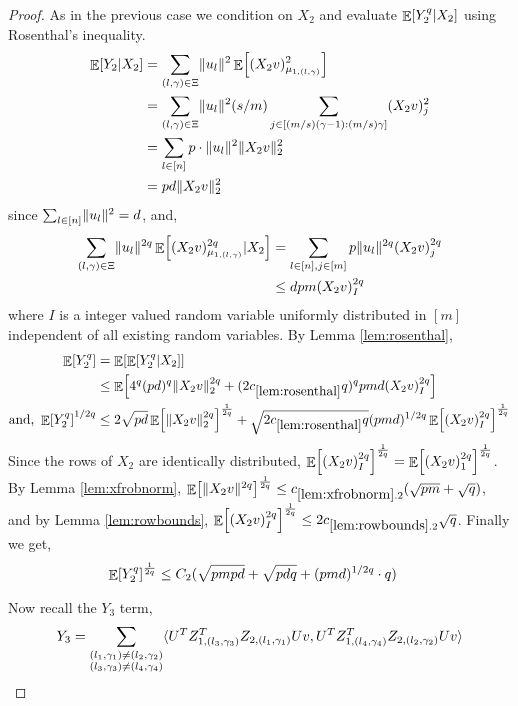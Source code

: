\documentclass[11pt]{amsart}
\numberwithin{equation}{section}
\numberwithin{equation}{section}
\DeclareMathOperator{\E}{\mathbb{E}}
\DeclarePairedDelimiter{\norm}{\lVert}{\rVert}
\DeclarePairedDelimiter{\ip}{\langle}{\rangle}
\DeclarePairedDelimiter{\paren}{(}{)}
\DeclarePairedDelimiter{\sqbr}{[}{]}
\begin{document}
\begin{proof}
As in the previous case we condition on $X_2$ and evaluate $\E \sqbr{ Y_2^q \vert X_2 }$ using Rosenthal's inequality.
\begin{align*}
    \E[Y_2 \vert X_2] &= \sum_{(l,\gamma) \in \Xi} \norm{u_l}^2 \E \sqbr*{\paren{X_2 v}_{\mu_{1, (l,\gamma)}}^2}  \\
    &= \sum_{(l,\gamma) \in \Xi} \norm{u_l}^2 (s/m)\sum_{j \in [(m/s)(\gamma-1):(m/s)\gamma]} \paren{X_2 v}_{j}^2  \\
    &= \sum_{l \in [n]} p \cdot \norm{u_l}^2 \norm{X_2v}_2^2 \\
    &= pd \norm{X_2v}_2^2
\end{align*}
since $\sum_{l \in [n]} \norm{u_l}^2 = d$, and, 
\begin{align*}
    \sum_{(l,\gamma) \in \Xi} \norm{u_l}^{2q} \E \sqbr*{\paren{X_2 v}_{\mu_{1, (l,\gamma)}}^{2q} \vert X_2 } &= \sum_{l \in [n], j \in [m]} p \norm{u_l}^{2q} \paren{X_2 v}_{j}^{2q} \\
    &\le dpm \paren{X_2 v}_{I}^{2q}
\end{align*}
where $I$ is a integer valued random variable uniformly distributed in $[m]$ independent of all existing random variables.
By Lemma \ref{lem:rosenthal}, 
\begin{align*}
    \E \sqbr*{Y_2^q} &= \E \sqbr*{ \E \sqbr*{ Y_2^q \vert X_2 }} \\
    &\le \E \sqbr*{ 4^q (pd)^q \norm{X_2v}_2^{2q} + (2c_{\ref{lem:rosenthal}}q)^q pmd \paren{X_2v}_I^{2q} } \\
    \text{and, } \E \sqbr*{Y_2^q}^{1/2q} &\le 2 \sqrt{pd} \E \sqbr*{\norm{X_2v}_2^{2q}}^\frac{1}{2q} + \sqrt{2c_{\ref{lem:rosenthal}}q} (pmd)^{1/2q} \E \sqbr*{\paren{X_2v}_I^{2q}}^\frac{1}{2q} 
\end{align*}
Since the rows of $X_2$ are identically distributed, $\E \sqbr*{\paren{X_2v}_I^{2q}}^\frac{1}{2q} = \E \sqbr*{\paren{X_2v}_1^{2q}}^\frac{1}{2q}$. By Lemma \ref{lem:xfrobnorm}, $\E \sqbr*{\norm{X_2v}^{2q}}^\frac{1}{2q} \le c_{\ref{lem:xfrobnorm}.2}(\sqrt{pm} + \sqrt{q})$, and by Lemma \ref{lem:rowbounds}, $\E \sqbr*{\paren{X_2v}_I^{2q}}^\frac{1}{2q} \le 2 c_{\ref{lem:rowbounds}.2} \sqrt{q}$. Finally we get,
\begin{align*}
    \E \sqbr*{Y_2^q}^\frac{1}{2q} &\le C_2(\sqrt{pmpd} + \sqrt{pdq} + (pmd)^{1/2q} \cdot q )
\end{align*}

Now recall the $Y_3$ term,
\[ Y_3 = \sum_{\substack{(l_1, \gamma_1) \neq (l_2, \gamma_2) \\ (l_3, \gamma_3) \neq (l_4, \gamma_4)}} \ip{U^TZ^T_{1,(l_3,\gamma_3) }Z_{2,(l_1,\gamma_1)}Uv,U^TZ^T_{1,(l_4,\gamma_4) }Z_{2,(l_2, \gamma_2)}Uv}\]


\end{proof}
\end{document}
